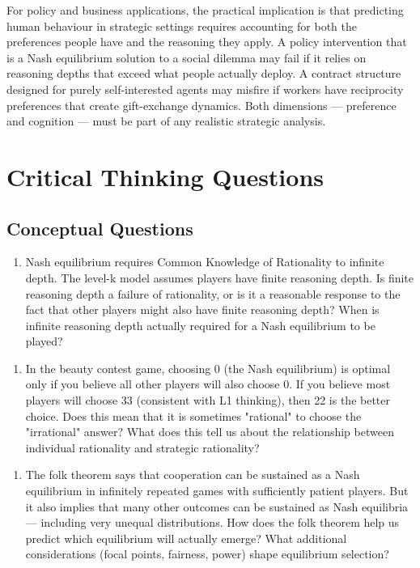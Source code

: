 \documentclass[12pt, letterpaper]{article}
\begin{document}
For policy and business applications, the practical implication is that predicting human behaviour in strategic settings requires accounting for both the preferences people have and the reasoning they apply. A policy intervention that is a Nash equilibrium solution to a social dilemma may fail if it relies on reasoning depths that exceed what people actually deploy. A contract structure designed for purely self-interested agents may misfire if workers have reciprocity preferences that create gift-exchange dynamics. Both dimensions --- preference and cognition --- must be part of any realistic strategic analysis.

\medskip


\section*{Critical Thinking Questions}



\subsection{Conceptual Questions}


\begin{enumerate}
\item Nash equilibrium requires Common Knowledge of Rationality to infinite depth. The level-k model assumes players have finite reasoning depth. Is finite reasoning depth a failure of rationality, or is it a reasonable response to the fact that other players might also have finite reasoning depth? When is infinite reasoning depth actually required for a Nash equilibrium to be played?
\end{enumerate}

\begin{enumerate}
\item In the beauty contest game, choosing 0 (the Nash equilibrium) is optimal only if you believe all other players will also choose 0. If you believe most players will choose 33 (consistent with L1 thinking), then 22 is the better choice. Does this mean that it is sometimes "rational" to choose the "irrational" answer? What does this tell us about the relationship between individual rationality and strategic rationality?
\end{enumerate}

\begin{enumerate}
\item The folk theorem says that cooperation can be sustained as a Nash equilibrium in infinitely repeated games with sufficiently patient players. But it also implies that many other outcomes can be sustained as Nash equilibria --- including very unequal distributions. How does the folk theorem help us predict which equilibrium will actually emerge? What additional considerations (focal points, fairness, power) shape equilibrium selection?
\end{enumerate}
\end{document}
